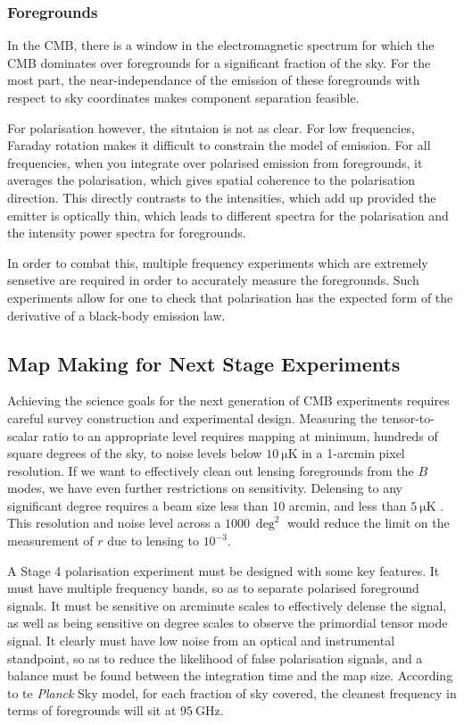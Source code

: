 \subsubsection{Foregrounds}
In the CMB, there is a window in the electromagnetic spectrum for which the CMB dominates over foregrounds for a significant fraction of the sky. For the most part, the near-independance of the emission of these foregrounds with respect to sky coordinates makes component separation feasible. 

For polarisation however, the situtaion is not as clear. For low frequencies, Faraday rotation makes it difficult to constrain the model of emission. For all frequencies, when you integrate over polarised emission from foregrounds, it averages the polarisation, which gives spatial coherence to the polarisation direction. This directly contrasts to the intensities, which add up provided the emitter is optically thin, which leads to different spectra for the polarisation and the intensity power spectra for foregrounds.

In order to combat this, multiple frequency experiments which are extremely sensetive are required in order to accurately measure the foregrounds. Such experiments allow for one to check that polarisation has the expected form of the derivative of a black-body emission law. 

\subsection{Map Making for Next Stage Experiments}
Achieving the science goals for the next generation of CMB experiments requires careful survey construction and experimental design. Measuring the tensor-to-scalar ratio to an appropriate level requires mapping at minimum, hundreds of square degrees of the sky, to noise levels below $\SI{10}{\micro\kelvin}$ in a 1-arcmin pixel resolution. If we want to effectively clean out lensing foregrounds from the $B$ modes, we have even further restrictions on sensitivity. Delensing to any significant degree requires a beam size less than 10 arcmin, and less than $\SI{5}{\micro\kelvin}$ \cite{0811.3915}. This resolution and noise level across a $\SI{1000}{\deg^2}$ would reduce the limit on the measurement of $r$ due to lensing to $10^{-3}$.

\par A Stage 4 polarisation experiment must be designed with some key features. It must have multiple frequency bands, so as to separate polarised foreground signals. It must be sensitive on arcminute scales to effectively delense the signal, as well as being sensitive on degree scales to observe the primordial tensor mode signal. It clearly must have low noise from an optical and instrumental standpoint, so as to reduce the likelihood of false polarisation signals, and a balance must be found between the integration time and the map size. According to te \textit{Planck} Sky model, for each fraction of sky covered, the cleanest frequency in terms of foregrounds will sit at $\SI{95}{\giga\hertz}$. 

